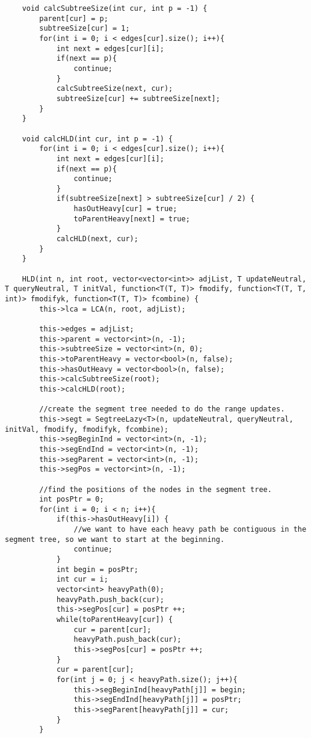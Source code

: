 \documentclass[8pt, headheight=10pt, a4paper]{article}
\begin{document}
\begin{multicols*}{3}
\begin{lstlisting}
    void calcSubtreeSize(int cur, int p = -1) {
        parent[cur] = p;
        subtreeSize[cur] = 1;
        for(int i = 0; i < edges[cur].size(); i++){
            int next = edges[cur][i];
            if(next == p){
                continue;
            }
            calcSubtreeSize(next, cur);
            subtreeSize[cur] += subtreeSize[next];
        }
    }

    void calcHLD(int cur, int p = -1) {
        for(int i = 0; i < edges[cur].size(); i++){
            int next = edges[cur][i];
            if(next == p){
                continue;
            }
            if(subtreeSize[next] > subtreeSize[cur] / 2) {
                hasOutHeavy[cur] = true;
                toParentHeavy[next] = true;
            }
            calcHLD(next, cur);
        }
    }

    HLD(int n, int root, vector<vector<int>> adjList, T updateNeutral, T queryNeutral, T initVal, function<T(T, T)> fmodify, function<T(T, T, int)> fmodifyk, function<T(T, T)> fcombine) {
        this->lca = LCA(n, root, adjList);
        
        this->edges = adjList;
        this->parent = vector<int>(n, -1);
        this->subtreeSize = vector<int>(n, 0);
        this->toParentHeavy = vector<bool>(n, false);
        this->hasOutHeavy = vector<bool>(n, false);
        this->calcSubtreeSize(root);
        this->calcHLD(root);

        //create the segment tree needed to do the range updates. 
        this->segt = SegtreeLazy<T>(n, updateNeutral, queryNeutral, initVal, fmodify, fmodifyk, fcombine);
        this->segBeginInd = vector<int>(n, -1);
        this->segEndInd = vector<int>(n, -1);
        this->segParent = vector<int>(n, -1);
        this->segPos = vector<int>(n, -1);

        //find the positions of the nodes in the segment tree. 
        int posPtr = 0;
        for(int i = 0; i < n; i++){
            if(this->hasOutHeavy[i]) {
                //we want to have each heavy path be contiguous in the segment tree, so we want to start at the beginning. 
                continue;
            }
            int begin = posPtr;
            int cur = i;
            vector<int> heavyPath(0);
            heavyPath.push_back(cur);
            this->segPos[cur] = posPtr ++;
            while(toParentHeavy[cur]) {
                cur = parent[cur];
                heavyPath.push_back(cur);
                this->segPos[cur] = posPtr ++;
            }
            cur = parent[cur];
            for(int j = 0; j < heavyPath.size(); j++){
                this->segBeginInd[heavyPath[j]] = begin;
                this->segEndInd[heavyPath[j]] = posPtr;
                this->segParent[heavyPath[j]] = cur;
            }
        }


\end{lstlisting}
\end{multicols*}
\end{document}
